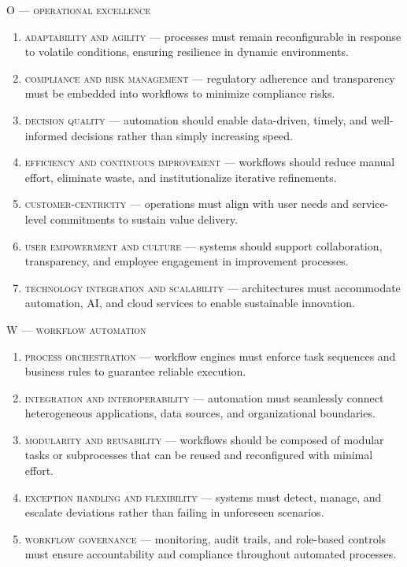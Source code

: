 \noindent\textsc{O --- operational excellence}
\begin{enumerate}
  \item \textsc{adaptability and agility} --- processes must remain reconfigurable in response to volatile conditions, ensuring resilience in dynamic environments.
  \item \textsc{compliance and risk management} --- regulatory adherence and transparency must be embedded into workflows to minimize compliance risks.
  \item \textsc{decision quality} --- automation should enable data-driven, timely, and well-informed decisions rather than simply increasing speed.
  \item \textsc{efficiency and continuous improvement} --- workflows should reduce manual effort, eliminate waste, and institutionalize iterative refinements.
  \item \textsc{customer-centricity} --- operations must align with user needs and service-level commitments to sustain value delivery.
  \item \textsc{user empowerment and culture} --- systems should support collaboration, transparency, and employee engagement in improvement processes.
  \item \textsc{technology integration and scalability} --- architectures must accommodate automation, AI, and cloud services to enable sustainable innovation.
\end{enumerate}

\noindent\textsc{W --- workflow automation}
\begin{enumerate}
  \item \textsc{process orchestration} --- workflow engines must enforce task sequences and business rules to guarantee reliable execution.
  \item \textsc{integration and interoperability} --- automation must seamlessly connect heterogeneous applications, data sources, and organizational boundaries.
  \item \textsc{modularity and reusability} --- workflows should be composed of modular tasks or subprocesses that can be reused and reconfigured with minimal effort.
  \item \textsc{exception handling and flexibility} --- systems must detect, manage, and escalate deviations rather than failing in unforeseen scenarios.
  \item \textsc{workflow governance} --- monitoring, audit trails, and role-based controls must ensure accountability and compliance throughout automated processes.
\end{enumerate}


